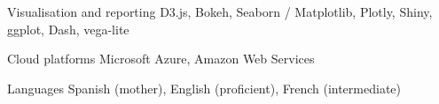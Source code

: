 \begin{cvskills}

\cvskill
{Visualisation and reporting } %
{D3.js, Bokeh, Seaborn / Matplotlib, Plotly, Shiny, ggplot, Dash, vega-lite} %


\cvskill
{Cloud platforms } %
{Microsoft Azure, Amazon Web Services } %







\cvskill
{Languages} %
{Spanish (mother), English (proficient), French (intermediate)} %


\end{cvskills}